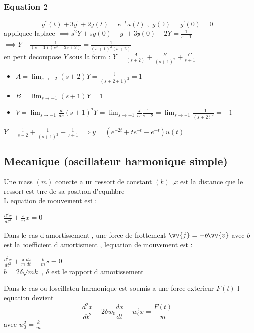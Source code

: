 \documentclass[12pt]{book}
\begin{document}
                \subsubsection*{Equation 2}
                $$ y^{''}(t) +3y^{'}+2y(t) = e^{-t}u(t) \; , \; y(0) = y^{'}(0)=0 $$
                appliquee laplace $\implies s^2Y+sy(0)-y^{'} +3y(0) + 2Y = \frac{1}{s+1} $\\
                $\implies Y - \frac{1}{(s+1)(s^2+3s+3)}=\frac{1}{(s+1)^2(s+2)}$ \\
                en peut decompose $Y$ sous la form : $Y = \frac{A}{(s+2)}+\frac{B}{(s+1)^2}+\frac{C}{s+1}$
                \begin{itemize}
                    \item $A = \lim_{s \to -2}(s+2)Y = \frac{1}{(s+2+1)^2}=1$
                    \item $B = \lim_{s \to -1}(s+1)Y =1$
                    \item $V = \lim_{s \to -1}\frac{d}{ds}(s+1)^2Y = \lim_{s \to -1} \frac{d}{ds}\frac{1}{s+2} = \lim_{s \to -1}\frac{-1}{(s+2)^2} = -1$
                \end{itemize}
                $Y = \frac{1}{s+2}+\frac{1}{(s+1)^2}-\frac{1}{s+1} \implies y = (e^{-2t}+te^{-t}-e^{-t})u(t)$
            \subsection{Mecanique (oscillateur harmonique simple)}
                Une mass $(m)$ conecte a un ressort de constant $(k)$ ,$x$ est la distance que le ressort est tire de sa position d'equilibre \\
                L equation de mouvement est :\begin{center}
                    $\frac{d^2x}{dt^2}+\frac{k}{m}x = 0$ 
                \end{center}
                Dans le cas d amortissement , une force de frottement $\vv{f} = -b\vv{v}$ avec $b$ est la coefficient d amortisment , lequation de mouvement est :
                \begin{center}
                    $\frac{d^2x}{dt^2}+\frac{b}{m}\frac{dx}{dt}+\frac{k}{m}x = 0 $\\ $b =2\delta\sqrt{mk} \; , \; \delta $ est le rapport d amortissement
                \end{center}
                Dans le cas ou loscillateu harmonique est soumis a une force exterieur $F(t)$ l equation devient 
                $$ \frac{d^2x}{dt^2}+2\delta w_0 \frac{dx}{dt} + w_0^2x = \frac{F(t)}{m} $$ avec $w_0^2 =\frac{k}{m}$
                \pagebreak
\end{document}
